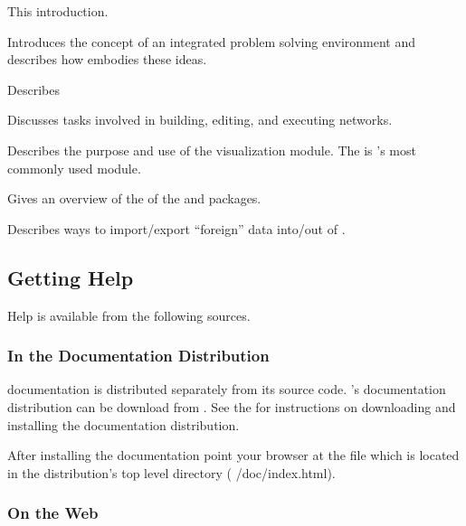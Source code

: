 \begin{description}
   This introduction.
  
   Introduces the concept of
  an integrated problem solving environment and describes how \SR{}
  embodies these ideas.
  
   Describes

  Discusses tasks involved in building, editing, and executing
  networks.

  Describes the purpose and use of the \viewer visualization module.
  The \viewer{} is \sr{}'s most commonly used module.

   Gives an overview of the 
  of the \sr{} and \biopse{} packages.
  
   Describes
  ways to import/export ``foreign'' data into/out of \SR{}.
\end{description}

\subsection{Getting Help}
\label{sec:help}

Help is available from the following sources.

\subsubsection{In the Documentation Distribution}

\sr{} documentation is distributed separately from its source code.
\sr{}'s documentation distribution can be download from
.  See the \sr{}
 for
instructions on downloading and installing the documentation
distribution.

After installing the documentation point your browser at the
 file which is located in the distribution's top
level  directory (\ie{} /doc/index.html).

\subsubsection{On the Web}

